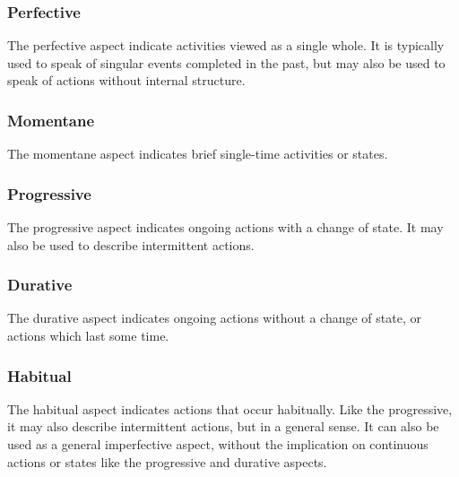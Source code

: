 \documentclass[grammar]{subfiles}
\begin{document}
\subsubsection{Perfective}
\label{vm:sssec_perfective}

The perfective aspect indicate activities viewed as a single whole.  It is
typically used to speak of singular events completed in the past, but may also
be used to speak of actions without internal structure.


\subsubsection{Momentane}
\label{vm:sssec_momentane}

The momentane aspect indicates brief single-time activities or states.


\subsubsection{Progressive}
\label{vm:sssec_progressive}

The progressive aspect indicates ongoing actions with a change of state.  It
may also be used to describe intermittent actions.


\subsubsection{Durative}
\label{vm:sssec_durative}

The durative aspect indicates ongoing actions without a change of state, or
actions which last some time.


\subsubsection{Habitual}
\label{vm:sssec_habitual}

The habitual aspect indicates actions that occur habitually.  Like the
progressive, it may also describe intermittent actions, but in a general sense.
It can also be used as a general imperfective aspect, without the implication
on continuous actions or states like the progressive and durative aspects. 
\end{document}
